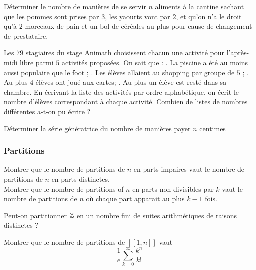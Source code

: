 
\begin{exo}
Déterminer le nombre de manières de se servir $n$ aliments à la cantine sachant que les pommes sont prises par $3$, les yaourts vont par $2$, et qu'on n'a le droit qu'à $2$ morceaux de pain et un bol de céréales au plus pour cause de changement de prestataire.
\end{exo}

\begin{exo}
Les $79$ stagiaires du stage Animath choisissent chacun une activité pour l’après-midi libre parmi $5$ activités proposées. On sait que :
. La piscine a été au moins aussi populaire que le foot ;
. Les élèves allaient au shopping par groupe de $5$ ;
. Au plus $4$ élèves ont joué aux cartes;
. Au plus un élève est resté dans sa chambre.
En écrivant la liste des activités par ordre alphabétique, on écrit le nombre d’élèves correspondant à chaque activité. Combien de listes de nombres différentes a-t-on pu écrire ?
\end{exo}

\begin{exo}
Déterminer la série génératrice du nombre de manières payer $n$ centimes
\end{exo}

\subsubsection{Partitions}

\begin{exo}
Montrer que le nombre de partitions de $n$ en parts impaires vaut le nombre de partitions de $n$ en parts distinctes. \\
Montrer que le nombre de partitions of $n$ en parts non divisibles par $k$ vaut le nombre de partitions de $n$ où chaque part apparait au plus $k - 1$ fois.
\end{exo}

\begin{exo}
Peut-on partitionner $\mathbb Z$ en un nombre fini de suites arithmétiques de raisons distinctes ?
\end{exo}


\begin{exo}
Montrer que le nombre de partitions de $[\![1, n]\!]$ vaut
$$\frac 1e \sum_{k=0}^\infty \frac{k^n}{k!} $$
\end{exo}


